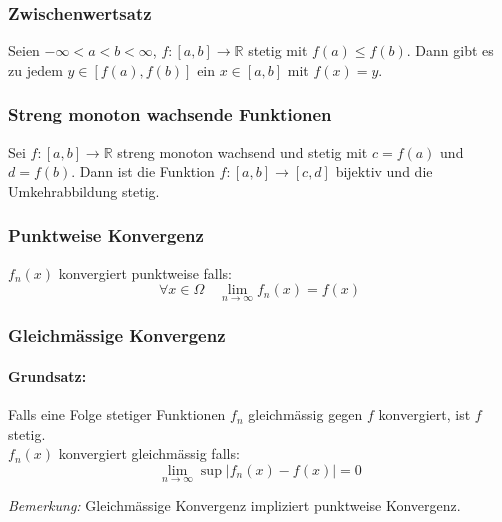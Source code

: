 \documentclass[6pt]{article}
\begin{document}
\begin{multicols*}{3}
\subsubsection*{Zwischenwertsatz}
	Seien $-\infty < a < b < \infty$, $f:[a,b] \to \mathbb{R}$ stetig mit $f(a) \leq f(b)$. Dann gibt es zu jedem $y \in [f(a), f(b)]$ ein $x \in [a,b]$ mit $f(x) = y$.
		
\subsubsection*{Streng monoton wachsende Funktionen}
		Sei $f: [a,b] \to \mathbb{R}$ streng monoton wachsend und stetig mit $c = f(a)$ und $d = f(b)$. Dann ist die Funktion $f:[a,b] \to [c,d]$ bijektiv
		und die Umkehrabbildung stetig.

\subsubsection*{Punktweise Konvergenz}
$f_n(x)$ konvergiert punktweise falls:
\begin{equation*}
	\forall x\in \Omega \quad \lim_{n\rightarrow\infty}f_n(x) = f(x)
\end{equation*}

\subsubsection*{Gleichm{\"a}ssige Konvergenz}

\paragraph{Grundsatz:} Falls eine Folge stetiger Funktionen $f_n$ gleichm{\"a}ssig gegen $f$ konvergiert, ist $f$ stetig.\\

$f_n(x)$ konvergiert gleichm{\"a}ssig falls:
\begin{equation*}
	\lim_{n\rightarrow\infty} \sup|f_n(x) - f(x)| = 0
\end{equation*}

\emph{Bemerkung:} Gleichm{\"a}ssige Konvergenz impliziert punktweise Konvergenz.


\end{multicols*}
\end{document}

